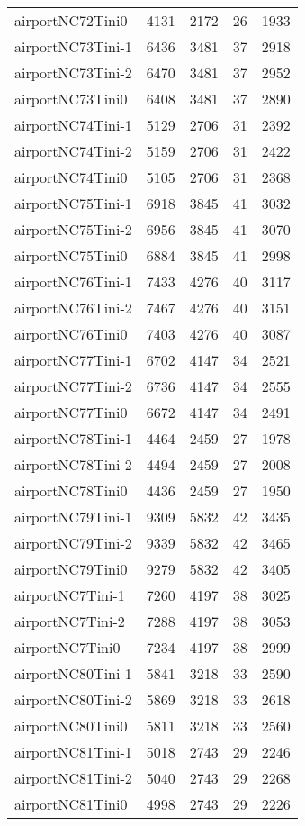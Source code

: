 \begin{longtable}{lrrrr}
airportNC72Tini0 & 4131 & 2172 & 26 & 1933 \\
airportNC73Tini-1 & 6436 & 3481 & 37 & 2918 \\
airportNC73Tini-2 & 6470 & 3481 & 37 & 2952 \\
airportNC73Tini0 & 6408 & 3481 & 37 & 2890 \\
airportNC74Tini-1 & 5129 & 2706 & 31 & 2392 \\
airportNC74Tini-2 & 5159 & 2706 & 31 & 2422 \\
airportNC74Tini0 & 5105 & 2706 & 31 & 2368 \\
airportNC75Tini-1 & 6918 & 3845 & 41 & 3032 \\
airportNC75Tini-2 & 6956 & 3845 & 41 & 3070 \\
airportNC75Tini0 & 6884 & 3845 & 41 & 2998 \\
airportNC76Tini-1 & 7433 & 4276 & 40 & 3117 \\
airportNC76Tini-2 & 7467 & 4276 & 40 & 3151 \\
airportNC76Tini0 & 7403 & 4276 & 40 & 3087 \\
airportNC77Tini-1 & 6702 & 4147 & 34 & 2521 \\
airportNC77Tini-2 & 6736 & 4147 & 34 & 2555 \\
airportNC77Tini0 & 6672 & 4147 & 34 & 2491 \\
airportNC78Tini-1 & 4464 & 2459 & 27 & 1978 \\
airportNC78Tini-2 & 4494 & 2459 & 27 & 2008 \\
airportNC78Tini0 & 4436 & 2459 & 27 & 1950 \\
airportNC79Tini-1 & 9309 & 5832 & 42 & 3435 \\
airportNC79Tini-2 & 9339 & 5832 & 42 & 3465 \\
airportNC79Tini0 & 9279 & 5832 & 42 & 3405 \\
airportNC7Tini-1 & 7260 & 4197 & 38 & 3025 \\
airportNC7Tini-2 & 7288 & 4197 & 38 & 3053 \\
airportNC7Tini0 & 7234 & 4197 & 38 & 2999 \\
airportNC80Tini-1 & 5841 & 3218 & 33 & 2590 \\
airportNC80Tini-2 & 5869 & 3218 & 33 & 2618 \\
airportNC80Tini0 & 5811 & 3218 & 33 & 2560 \\
airportNC81Tini-1 & 5018 & 2743 & 29 & 2246 \\
airportNC81Tini-2 & 5040 & 2743 & 29 & 2268 \\
airportNC81Tini0 & 4998 & 2743 & 29 & 2226 \\

\end{longtable}
